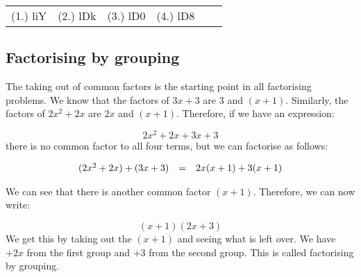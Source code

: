 \begin{exercises}{}
{\begin{enumerate}[itemsep=5pt, label=\textbf{\arabic*}. ]
\end{enumerate}
\practiceinfo 
\par 
 \par \begin{tabular}[h]{cccccc}
 (1.) liY  &  (2.) lDk  &  (3.) lD0  &  (4.) lD8  & \end{tabular}
}
\end{exercises} 


\subsection{Factorising by grouping}

The taking out of common factors is the starting point in all factorising problems. We know that the factors of $3x+3$  are $3$ and $(x+1)$. Similarly, the factors of $2{x}^{2}+2x$ are $2x$ and $(x+1)$. Therefore, if we have an expression:\par 

\begin{equation*}
2{x}^{2}+2x+3x+3
\end{equation*}
there is no common factor to all four terms, but we can factorise as follows:


\begin{equation*}
\begin{array}{ccl}
(2{x}^{2}+2x)+(3x+3) &=& 2x(x+1)+3(x+1) \hfill \hfill
\end{array}
\end{equation*}


We can see that there is another common factor $(x+1)$. Therefore, we can now write:\par 
\begin{equation*}
(x+1)(2x+3)
\end{equation*}
We get this by taking out the $(x+1)$ and seeing what is left over. We have $+2x$ from the first group and $+3$ from the second group. This is called factorising by grouping.\par 



